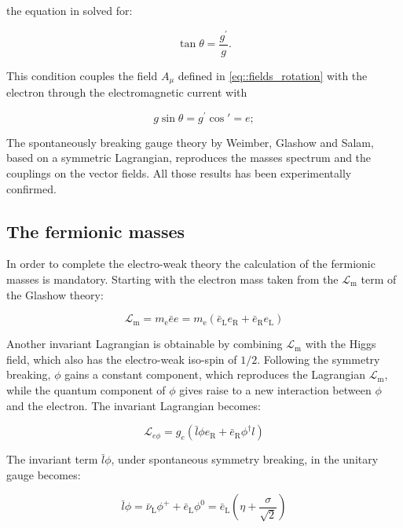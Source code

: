 the equation in solved for:

\begin{equation}
\tan\theta = \dfrac{g^{\prime}}{g}.
\label{eq::matrix_solution}
\end{equation}

This condition couples the field $A_{\mu}$ defined in \autoref{eq::fields_rotation} with the electron through the electromagnetic current with

\begin{equation}
g\sin\theta = g^{\prime} \cos\prime = e; 
\end{equation}

The spontaneously breaking gauge theory by Weimber, Glashow and Salam, based on a symmetric Lagrangian, reproduces the masses spectrum and the couplings on the vector fields. All those results has been experimentally confirmed.

\subsection{The fermionic masses}

In order to complete the electro-weak theory the calculation of the fermionic masses is mandatory. Starting with the electron mass taken from the $\mathcal{L}_{\text{m}}$ term of the Glashow theory:

\begin{equation}
\mathcal{L}_{\text{m}} = m_{\text{e}}\bar{e}e = m_{\text{e}}(\bar{e}_{\text{L}}e_{\text{R}} + \bar{e}_{\text{R}}e_{\text{L}})
\end{equation}

Another invariant Lagrangian is obtainable by combining $\mathcal{L}_{\text{m}}$ with the Higgs field, which also has the electro-weak iso-spin of $1/2$. Following the symmetry breaking, $\phi$ gains a constant component, which reproduces the Lagrangian  $\mathcal{L}_{\text{m}}$, while the quantum component of $\phi$ gives raise to a new interaction between $\phi$ and the electron. The invariant Lagrangian becomes:

\begin{equation}
\mathcal{L}_{e\phi} = g_{e} (\bar{l}\phi e_{\text{R}} + \bar{e}_{\text{R}}\phi^{\dagger}l)
\end{equation}

The invariant term $\bar{l}\phi$, under spontaneous symmetry breaking, in the unitary gauge becomes:

\begin{equation}
\bar{l}\phi = \bar{\nu}_{\text{L}}\phi^{+} + \bar{e}_{\text{L}}\phi^{0} = \bar{e}_{\text{L}}\left(\eta + \dfrac{\sigma}{\sqrt{2}}\right)
\end{equation}

